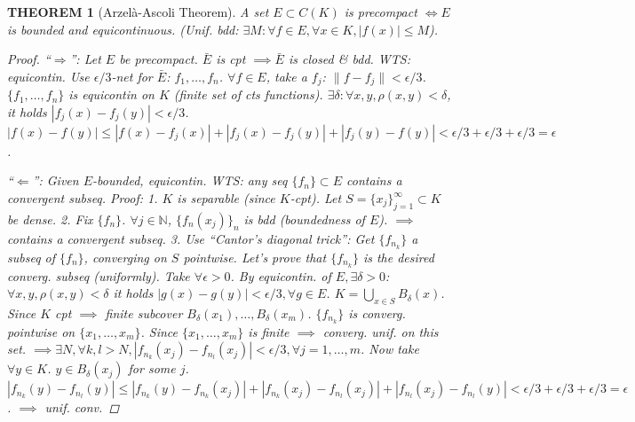 \documentclass[12pt]{article}
\theoremstyle{blueplain}
\newtheorem{theorem}{THEOREM}[section]
\theoremstyle{bluedef}
\theoremstyle{blueremark}
\newcommand{\N}{\mathbb{N}}
\numberwithin{equation}{section}
\begin{document}
      \begin{theorem}[Arzel\`a-Ascoli Theorem]
        A set $E \subset C(K)$ is precompact $\iff E$ is bounded and equicontinuous.
        (Unif. bdd: $\exists M: \forall f \in E, \forall x \in K, |f(x)| \leq M$).
        \begin{proof}
          ``$\Rightarrow$'': Let $E$ be precompact. $\bar{E}$ is cpt $\implies \bar{E}$ is closed \& bdd.
          WTS: equicontin.
          Use $\epsilon/3$-net for $\bar{E}$: $f_1, \ldots, f_n$.
          $\forall f \in E$, take a $f_j$: $\|f - f_j\| < \epsilon/3$.
          $\{f_1, \ldots, f_n\}$ is equicontin on $K$ (finite set of cts functions).
          $\exists \delta: \forall x, y, \rho(x, y) < \delta$, it holds $|f_j(x) - f_j(y)| < \epsilon/3$.
          $|f(x) - f(y)| \leq |f(x) - f_j(x)| + |f_j(x) - f_j(y)| + |f_j(y) - f(y)| < \epsilon/3 + \epsilon/3 + \epsilon/3 = \epsilon$.

          ``$\Leftarrow$'': Given $E$-bounded, equicontin.
          WTS: any seq $\{f_n\} \subset E$ contains a convergent subseq.
          Proof:
          1. $K$ is separable (since $K$-cpt). Let $S = \{x_j\}_{j=1}^\infty \subset K$ be dense.
          2. Fix $\{f_n\}$. $\forall j \in \N$, $\{f_n(x_j)\}_n$ is bdd (boundedness of $E$).
          $\implies$ contains a convergent subseq.
          3. Use ``Cantor's diagonal trick'':
          Get $\{f_{n_k}\}$ a subseq of $\{f_n\}$, converging on $S$ pointwise.
          Let's prove that $\{f_{n_k}\}$ is the desired converg. subseq (uniformly).
          Take $\forall \epsilon > 0$. By equicontin. of $E, \exists \delta > 0$: $\forall x, y, \rho(x, y) < \delta$ it holds $|g(x) - g(y)| < \epsilon/3, \forall g \in E$.
          $K = \bigcup_{x \in S} B_\delta(x)$. Since $K$ cpt $\implies$ finite subcover $B_\delta(x_1), \ldots, B_\delta(x_m)$.
          $\{f_{n_k}\}$ is converg. pointwise on $\{x_1, \ldots, x_m\}$.
          Since $\{x_1, \ldots, x_m\}$ is finite $\implies$ converg. unif. on this set.
          $\implies \exists N, \forall k, l > N, |f_{n_k}(x_j) - f_{n_l}(x_j)| < \epsilon/3, \forall j=1,\ldots,m$.
          Now take $\forall y \in K$. $y \in B_\delta(x_j)$ for some $j$.
          $|f_{n_k}(y) - f_{n_l}(y)| \leq |f_{n_k}(y) - f_{n_k}(x_j)| + |f_{n_k}(x_j) - f_{n_l}(x_j)| + |f_{n_l}(x_j) - f_{n_l}(y)| < \epsilon/3 + \epsilon/3 + \epsilon/3 = \epsilon$.
          $\implies$ unif. conv.
        \end{proof}
      \end{theorem}
\end{document}
